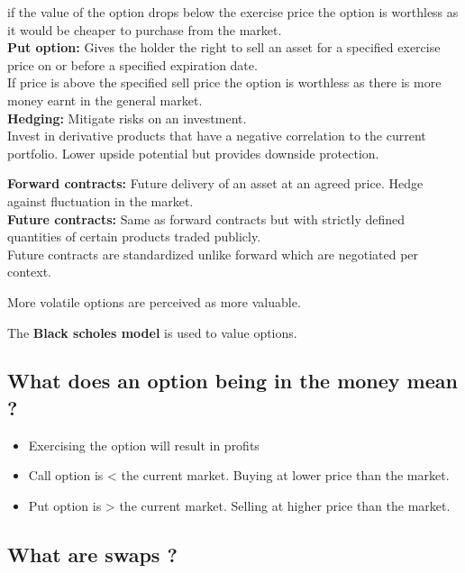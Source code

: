 \documentclass[11pt]{scrartcl} %
\begin{document}
if the value of the option drops below the exercise price the option is worthless as it would be cheaper to purchase from the market. \\

\textbf{Put option:} Gives the holder the right to sell an asset for a specified exercise price on or before a specified expiration date. \\

If price is above the specified sell price the option is worthless as there is more money earnt in the general market.\\

\textbf{Hedging:} Mitigate risks on an investment. \\

Invest in derivative products that have a negative correlation to the current portfolio.
Lower upside potential but provides downside protection.

\textbf{Forward contracts:} Future delivery of an asset at an agreed price. Hedge against fluctuation in the market.\\

\textbf{Future contracts:} Same as forward contracts but with strictly defined quantities of certain products traded publicly.\\

Future contracts are standardized unlike forward which are negotiated per context.

More volatile options are perceived as more valuable.

The \textbf{Black scholes model} is used to value options.

\subsection{What does an option being in the money mean ?}

\begin{itemize}
	\item Exercising the option will result in profits
	\item Call option is < the current market. Buying at lower price than the market.
	\item Put option is > the current market. Selling at higher price than the market.
\end{itemize}

\subsection{What are swaps ?}
\end{document}
